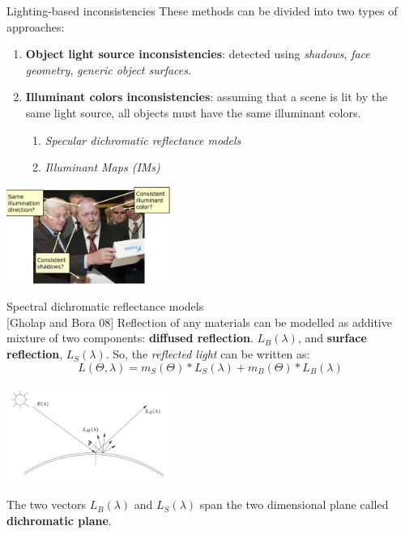 \begin{tframe}{Lighting-based inconsistencies}
\vspace{0.1cm}
These methods can be divided into two types of approaches:
\vspace{0.2cm}
\begin{enumerate}
\item \textbf{Object light source inconsistencies}: detected using \emph{shadows}, \emph{face geometry}, \emph{generic object surfaces}.
\vspace{0.2cm}

\item \textbf{Illuminant colors inconsistencies}: {\small assuming that a scene is lit by the same light source, all objects must have the same illuminant colors.}
\vspace{0.2cm}
\begin{enumerate}
\item \textit{Specular dichromatic reflectance models}
\vspace{0.1cm}
\item \textit{Illuminant Maps (IMs)}
\end{enumerate}
\end{enumerate}
\begin{center}
\includegraphics[width=0.4\textwidth]{images/lighting-based.jpg}
\end{center}
\end{tframe}

\begin{tframe}{Spectral dichromatic reflectance models\\{\small [Gholap and Bora 08]}}
\vspace{0.1cm}
Reflection of any materials can be modelled as additive mixture of two components: \textbf{diffused reflection}. $L_B(\lambda)$, and \textbf{surface reflection}, $L_S(\lambda)$. So, the \emph{reflected light} can be written as:
$$L(\Theta, \lambda) = m_S(\Theta)* L_S(\lambda) + m_B(\Theta) * L_B(\lambda)$$

\begin{center}
\includegraphics[width=0.4\textwidth]{images/reflectance.jpg}
\end{center}

The two vectors $L_B(\lambda)$ and $L_S(\lambda)$ span the two dimensional plane called \textbf{dichromatic plane}.
\end{tframe}


